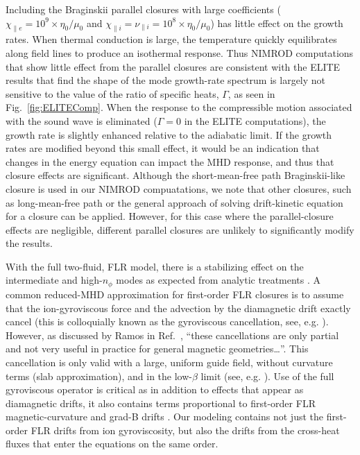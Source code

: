 Including the Braginskii parallel closures with large coefficients
($\chi_{\parallel e} = 10^9\times \eta_0/\mu_0$ and  $\chi_{\parallel i} =
\nu_{\parallel i} = 10^8\times \eta_0/\mu_0$) has little effect on the growth
rates.  When thermal conduction is large, the temperature quickly equilibrates
along field lines to produce an isothermal response.  Thus NIMROD computations
that show little effect from the parallel closures are consistent with the ELITE
results that find the shape of the mode growth-rate spectrum is largely not
sensitive to the value of the ratio of specific heats, $\Gamma$, as seen in
Fig.~\ref{fig:ELITEComp}. When the response to the compressible motion
associated with the sound wave is eliminated ($\Gamma=0$ in the ELITE 
computations), the growth rate is slightly enhanced relative to the adiabatic limit.
If the growth rates are modified beyond this small effect, it would be
an indication that changes in the energy equation can impact the MHD response, 
and thus that closure effects are significant. Although the short-mean-free
path Braginskii-like closure \cite{Braginskii,Catto04} is used in our NIMROD
compuatations, we note that other closures, such as long-mean-free path
\cite{Ramos11} or the general approach of solving drift-kinetic equation
\cite{held15} for a closure can be applied. However, for this case where the
parallel-closure effects are negligible, different parallel closures are
unlikely to significantly modify the results.

With the full two-fluid, FLR model, there is a stabilizing effect on the
intermediate and high-$n_\phi$ modes as expected from analytic
treatments \cite{Hastie03}. A common reduced-MHD approximation for
first-order FLR closures is to assume that the ion-gyroviscous force and
the advection by the diamagnetic drift exactly cancel (this is
colloquially known as the gyroviscous cancellation, see, e.g.
\cite{Coppi64}). However, as discussed by Ramos in
Ref.~\cite{Ramos:2007cn}, ``these cancellations are only partial and not
very useful in practice for general magnetic geometries\ldots''.  This
cancellation is only valid with a large, uniform guide field, without
curvature terms (slab approximation), and in the low-$\beta$ limit (see,
e.g. \cite{King14}).  Use of the full gyroviscous operator is critical
as in addition to effects that appear as diamagnetic drifts, it also
contains terms proportional to first-order FLR magnetic-curvature and
grad-B drifts \cite{King11}. Our modeling contains not just the
first-order FLR drifts from ion gyroviscosity, but also the drifts from
the cross-heat fluxes that enter the equations on the same order.  

